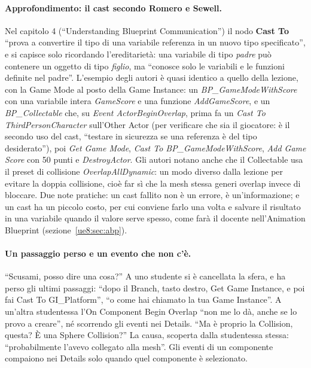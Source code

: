 \paragraph{Approfondimento: il cast secondo Romero e Sewell.} Nel capitolo 4
(``Understanding Blueprint Communication'') il nodo \textbf{Cast To} ``prova a convertire
il tipo di una variabile referenza in un nuovo tipo specificato'', e si capisce solo
ricordando l'ereditarietà: una variabile di tipo \emph{padre} può contenere un oggetto
di tipo \emph{figlio}, ma ``conosce solo le variabili e le funzioni definite nel padre''.
L'esempio degli autori è quasi identico a quello della lezione, con la Game Mode al posto
della Game Instance: un \emph{BP\_GameModeWithScore} con una variabile intera
\emph{GameScore} e una funzione \emph{AddGameScore}, e un \emph{BP\_Collectable} che, su
\emph{Event ActorBeginOverlap}, prima fa un \emph{Cast To ThirdPersonCharacter}
sull'Other Actor (per verificare che sia il giocatore: è il secondo uso del cast,
``testare in sicurezza se una referenza è del tipo desiderato''), poi \emph{Get Game
Mode}, \emph{Cast To BP\_GameModeWithScore}, \emph{Add Game Score} con 50 punti e
\emph{DestroyActor}. Gli autori notano anche che il Collectable usa il preset di
collisione \emph{OverlapAllDynamic}: un modo diverso dalla lezione per evitare la doppia
collisione, cioè far sì che la mesh stessa generi overlap invece di bloccare. Due note
pratiche: un cast fallito non è un errore, è un'informazione; e un cast ha un piccolo
costo, per cui conviene farlo una volta e salvare il risultato in una variabile quando il
valore serve spesso, come farà il docente nell'Animation Blueprint
(sezione~\ref{ue8:sec:abp}).

\paragraph{Un passaggio perso e un evento che non c'è.} ``Scusami, posso dire una cosa?''
A uno studente si è cancellata la sfera, e ha perso gli ultimi passaggi: ``dopo il
Branch, tasto destro, Get Game Instance, e poi fai Cast To GI\_Platform'', ``o come hai
chiamato la tua Game Instance''. A un'altra studentessa l'On Component Begin Overlap
``non me lo dà, anche se lo provo a creare'', né scorrendo gli eventi nei Details.
``Ma è proprio la Collision, questa? È una Sphere Collision?'' La causa, scoperta dalla
studentessa stessa: ``probabilmente l'avevo collegato alla mesh''. Gli eventi di un
componente compaiono nei Details solo quando quel componente è selezionato.

